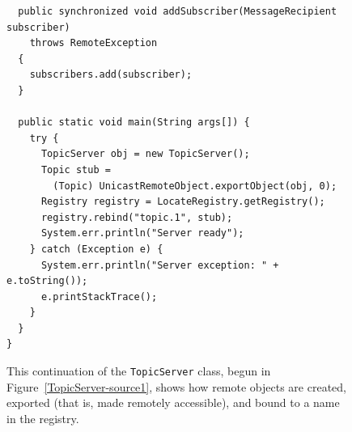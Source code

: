 \begin{figure}
\begin{verbatim}
  public synchronized void addSubscriber(MessageRecipient subscriber)
    throws RemoteException
  {
    subscribers.add(subscriber);
  }

  public static void main(String args[]) {
    try {
      TopicServer obj = new TopicServer();
      Topic stub =
        (Topic) UnicastRemoteObject.exportObject(obj, 0);
      Registry registry = LocateRegistry.getRegistry();
      registry.rebind("topic.1", stub);
      System.err.println("Server ready");
    } catch (Exception e) {
      System.err.println("Server exception: " + e.toString());
      e.printStackTrace();
    }
  }
}
\end{verbatim}
\caption{This continuation of the {\tt TopicServer} class, begun in Figure~\ref{TopicServer-source1},
  shows how remote objects are
  created, exported (that is, made remotely accessible), and bound to a
  name in the registry.}\label{TopicServer-source2}
\end{figure}

